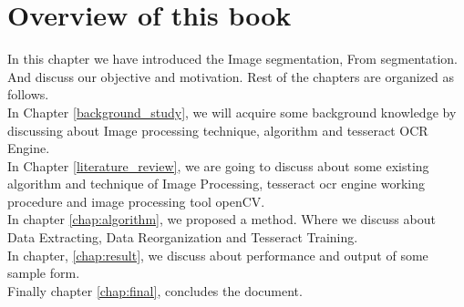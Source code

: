 \section{Overview of this book}
In this chapter we have introduced the Image segmentation, From segmentation. And discuss our objective and motivation. Rest of the chapters are organized as follows. \\
In Chapter \ref{background_study}, we will acquire some background knowledge by discussing about Image processing technique, algorithm and tesseract OCR Engine. \\
In Chapter \ref{literature_review}, we are going to discuss about some existing algorithm and technique of Image Processing, tesseract ocr engine working procedure and image processing tool openCV. \\
In chapter \ref{chap:algorithm}, we proposed a method. Where we discuss about Data Extracting, Data Reorganization and Tesseract Training. \\
In chapter, \ref{chap:result}, we discuss about performance and output of some sample form.\\
Finally chapter \ref{chap:final}, concludes the document.